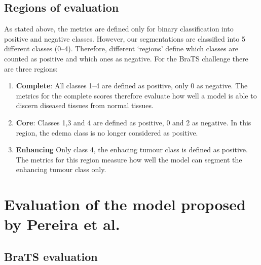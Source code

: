 \documentclass[12pt,a4paper,twoside,openright]{report}
\begin{document}
\subsection{Regions of evaluation}
As stated above, the metrics are defined only for binary classification into positive and negative classes. However, our segmentations are classified into 5 different classes (0--4). Therefore, different `regions' define which classes are counted as positive and which ones as negative. For the BraTS challenge there are three regions:
\begin{enumerate}
	\item \textbf{Complete}: All classes 1--4 are defined as positive, only 0 as negative. The metrics for the complete scores therefore evaluate how well a model is able to discern diseased tissues from normal tissues.
	\item \textbf{Core}: Classes 1,3 and 4 are defined as positive, 0 and 2 as negative. In this region, the edema class is no longer considered as positive.
	\item \textbf{Enhancing} Only class 4, the enhacing tumour class is defined as positive. The metrics for this region measure how well the model can segment the enhancing tumour class only.
\end{enumerate}


\section{Evaluation of the model proposed by Pereira et al.}
\subsection{BraTS evaluation}
\end{document}

